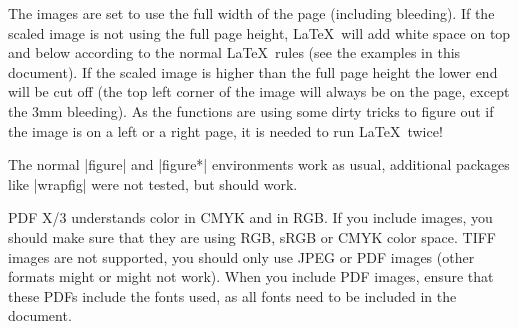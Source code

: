 \documentclass[english,10pt,bbook=pocketbig,inner=1cm,outer=2.5cm]{npblurb}
\begin{document}
The images are set to use the full width of the page (including bleeding). If the scaled image is not using the full page height, \LaTeX\ will add white space on top and below according to the normal \LaTeX\ rules (see the examples in this document). If the scaled image is higher than the full page height the lower end will be cut off (the top left corner of the image will always be on the page, except the 3mm bleeding). As the functions are using some dirty tricks to figure out if the image is on a left or a right page, {\color{highlight} it is needed to run \LaTeX\ twice!}

The normal |figure| and |figure*| environments work as usual, additional packages like |wrapfig| were not tested, but should work.

\begin{sumbox}
PDF X/3 understands color in CMYK and in RGB. If you include images, you should make sure that they are using RGB, sRGB or CMYK color space. TIFF images are not supported, you should only use JPEG or PDF images (other formats might or might not work). When you include PDF images, ensure that these PDFs include the fonts used, as all fonts need to be included in the document.
\end{sumbox}
\end{document}
